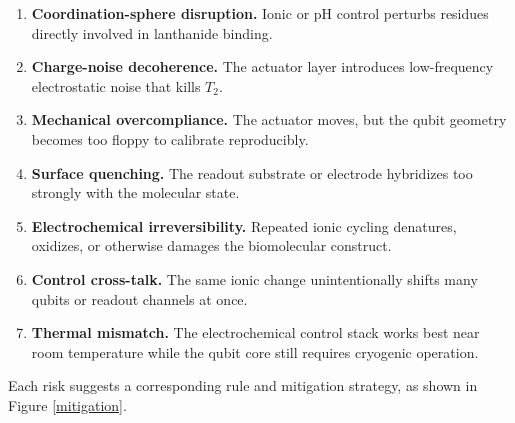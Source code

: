 \documentclass[11pt]{report}
\theoremstyle{definition}
\begin{document}
\begin{enumerate}[leftmargin=2em]
\item \textbf{Coordination-sphere disruption.} Ionic or pH control perturbs residues directly involved in lanthanide binding.
\item \textbf{Charge-noise decoherence.} The actuator layer introduces low-frequency electrostatic noise that kills $T_2$.
\item \textbf{Mechanical overcompliance.} The actuator moves, but the qubit geometry becomes too floppy to calibrate reproducibly.
\item \textbf{Surface quenching.} The readout substrate or electrode hybridizes too strongly with the molecular state.
\item \textbf{Electrochemical irreversibility.} Repeated ionic cycling denatures, oxidizes, or otherwise damages the biomolecular construct.
\item \textbf{Control cross-talk.} The same ionic change unintentionally shifts many qubits or readout channels at once.
\item \textbf{Thermal mismatch.} The electrochemical control stack works best near room temperature while the qubit core still requires cryogenic operation.
\end{enumerate}

Each risk suggests a corresponding rule and mitigation strategy, as shown in Figure \ref{mitigation}. 
\end{document}
